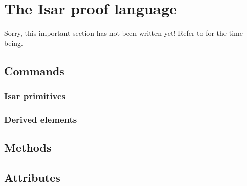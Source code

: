 \section{The Isar proof language}

Sorry, this important section has not been written yet!  Refer to
\cite{Wenzel:1999:TPHOL} for the time being.

\subsection{Commands}

\subsubsection{Isar primitives}

\subsubsection{Derived elements}


\subsection{Methods}

\subsection{Attributes}


